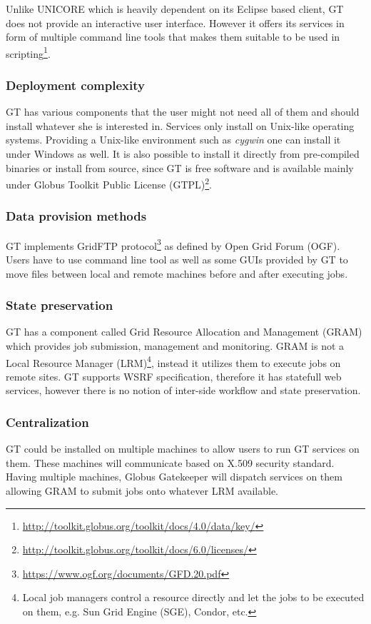 Unlike UNICORE which is heavily dependent on its Eclipse based client, 
GT does not provide an interactive user interface. However it offers its services in form of multiple command 
line tools that makes them suitable to be used in 
scripting\footnote{\url{http://toolkit.globus.org/toolkit/docs/4.0/data/key/}}.

\subsubsection {Deployment complexity}
GT has various components that the user might not need all of them and should install whatever she is
interested in. Services only install on Unix-like operating systems. Providing a Unix-like environment
such as \textit{cygwin} one can install it under Windows as well. It is also possible to install it directly
from pre-compiled binaries or install from source, since GT is free software and is available mainly
under Globus Toolkit Public License (GTPL)\footnote{\url{http://toolkit.globus.org/toolkit/docs/6.0/licenses/}}.

\subsubsection{Data provision methods}
GT implements GridFTP protocol\footnote{\url{https://www.ogf.org/documents/GFD.20.pdf}} as defined by Open Grid Forum (OGF).
Users have to use command line tool as well as some GUIs provided by GT to move files between local and remote 
machines before and after executing jobs.
\subsubsection {State preservation}
GT has a component called Grid Resource Allocation and Management (GRAM) which provides job submission, management
and monitoring. GRAM is not a Local Resource Manager (LRM)\footnote{Local job managers control a resource
directly and let the jobs to be executed on them, e.g. Sun Grid Engine (SGE), Condor, etc.}, instead it utilizes
them to execute jobs on remote sites. 
GT supports WSRF specification, therefore it has statefull web services, however there is no notion of inter-side workflow
and state preservation.
\subsubsection {Centralization}
GT could be installed on multiple machines to allow users to run GT services on them. These machines will communicate
based on X.509 security standard. Having multiple machines, Globus Gatekeeper will dispatch services on them allowing
GRAM to submit jobs onto whatever LRM available.
